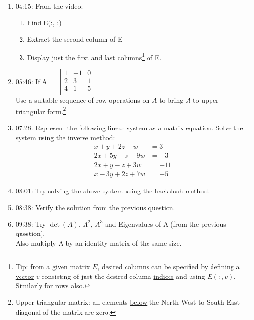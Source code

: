 \documentclass[12pt,a4paper]{article}
\renewcommand{\hl}[1]{#1}
\newenvironment{enumcpt}{\begin{enumerate} \topsep -3mm \partopsep -3mm 
                        \parsep -3mm
                        \itemsep -0mm \leftmargin -1in \rightmargin -3mm
                        }{\end{enumerate}}
\begin{document}
\begin{multicols}{2}
\begin{enumcpt}
\begin{enumcpt}
\item 04:15: From the video:
	\begin{enumcpt}
		\item Find E(:, :)
		\item Extract the second column of E
		\item Display just the first and last
    \hl{columns\footnote{\hl{Tip: from a given matrix $E$, desired columns 
    can be specified by defining}
    a \underline{vector} $v$ consisting of just the desired
     column \underline{indices} and using $E(:,v)$. Similarly for rows
     also.} of E.}
	\end{enumcpt}
\item 05:46: If A = 
$\begin{bmatrix}
1 & -1 & 0\\
2 & 3 & 1\\
4 & 1 & 5\\
\end{bmatrix}$
\\
Use a suitable sequence of row operations on $A$ to bring 
$A$ to upper triangular form.\footnote{Upper triangular matrix: all elements
\underline{below} the North-West to South-East diagonal of the matrix are zero.}
\item 07:28: Represent the following linear system as a matrix equation. Solve the system using the inverse method:
\begin{align*}
x+y+2z-w &= 3\\
2x+5y-z-9w &= -3\\
2x+y-z+3w &= -11\\
x-3y+2z+7w &= -5
\end{align*}
\item 08:01: Try solving the above system using the backslash method. 
\item 08:38: Verify the solution from the previous question. 
\item 09:38: Try $\det(A)$, $A^2$, $A^3$ and Eigenvalues of A (from the previous question). \\
Also multiply A by an identity matrix of the same size.  
\end{enumcpt}



\end{enumcpt}
\end{multicols}
\end{document}
